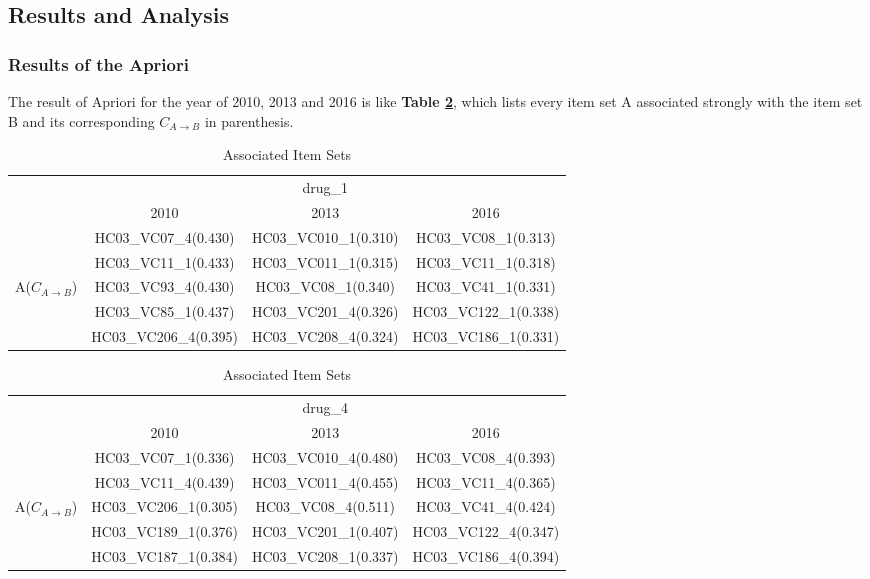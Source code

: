 \documentclass[12pt]{article}
\begin{document}
\subsection{Results and Analysis}
\subsubsection{Results of the Apriori}
The result of Apriori for the year of 2010, 2013 and 2016 is like \textbf{Table \ref{result}}, which lists every item set A associated strongly with the item set B and its corresponding $C_{A \to B}$ in parenthesis. 

\begin{table}[h]
\centering
\begin{tabular}{cccc}
  \toprule
   & \multicolumn{3}{c}{drug\_1} \\
  \cmidrule{2-4}
& 2010 & 2013 & 2016  \\
  \midrule
  & HC03\_VC07\_4(0.430) & HC03\_VC010\_1(0.310) & HC03\_VC08\_1(0.313)  \\
  & HC03\_VC11\_1(0.433) & HC03\_VC011\_1(0.315) & HC03\_VC11\_1(0.318)  \\
  A($C_{A \to B}$) & HC03\_VC93\_4(0.430) & HC03\_VC08\_1(0.340) & HC03\_VC41\_1(0.331)  \\
  & HC03\_VC85\_1(0.437) & HC03\_VC201\_4(0.326) & HC03\_VC122\_1(0.338)  \\
  & HC03\_VC206\_4(0.395) & HC03\_VC208\_4(0.324) & HC03\_VC186\_1(0.331)  \\
  \bottomrule
\end{tabular}
\begin{tabular}{cccc}
  \toprule
   & \multicolumn{3}{c}{drug\_4} \\
  \cmidrule{2-4}
& 2010 & 2013 & 2016  \\
  \midrule
  & HC03\_VC07\_1(0.336) & HC03\_VC010\_4(0.480) & HC03\_VC08\_4(0.393)  \\
  & HC03\_VC11\_4(0.439) & HC03\_VC011\_4(0.455) & HC03\_VC11\_4(0.365)  \\
  A($C_{A \to B}$) & HC03\_VC206\_1(0.305) & HC03\_VC08\_4(0.511) & HC03\_VC41\_4(0.424)  \\
  & HC03\_VC189\_1(0.376) & HC03\_VC201\_1(0.407) & HC03\_VC122\_4(0.347)  \\
  & HC03\_VC187\_1(0.384) & HC03\_VC208\_1(0.337) & HC03\_VC186\_4(0.394)  \\
  \bottomrule
\end{tabular}
\caption{Associated Item Sets}
\label{result}
\end{table}
\end{document}
